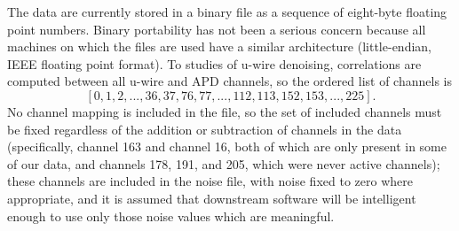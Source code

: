 The data are currently stored in a binary file as a sequence of eight-byte floating point numbers.  Binary portability has not been a serious concern because all machines on which the files are used have a similar architecture (little-endian, IEEE floating point format).  To studies of u-wire denoising, correlations are computed between all u-wire and APD channels, so the ordered list of channels is
\begin{equation}\label{eqn:ChannelListingForNoiseFile}
[0,1,2,...,36,37,76,77,...,112,113,152,153,...,225].
\end{equation}
No channel mapping is included in the file, so the set of included channels must be fixed regardless of the addition or subtraction of channels in the data (specifically, channel 163 and channel 16, both of which are only present in some of our data, and channels 178, 191, and 205, which were never active channels); these channels are included in the noise file, with noise fixed to zero where appropriate, and it is assumed that downstream software will be intelligent enough to use only those noise values which are meaningful.

